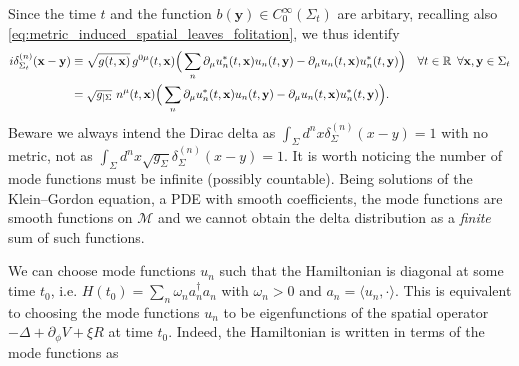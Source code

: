 \documentclass[../QFT_main.tex]{subfiles}
\begin{document}
\begin{mytheorem}
\noindent
Since the time $t$ and the function $b(\mathbf{y})\in C^\infty_0(\Sigma_t)$ are arbitary, recalling also \eqref{eq:metric_induced_spatial_leaves_folitation}, we thus identify
{\small
\begin{align}\label{eq:completeness_relation_bogoliubov_basis_explicit}
  i\delta^{(n)}_{\Sigma_t}(\mathbf{x}-\mathbf{y}) &\equiv \sqrt{g(t,\mathbf{x})}\, g^{0\mu}(t,\mathbf{x}) \Big( \sum_n \partial_\mu u_n^*(t,\mathbf{x}) u_n(t,\mathbf{y})-\partial_\mu u_n(t,\mathbf{x}) u_n^*(t,\mathbf{y}) \Big)\quad \forall t\in\mathbb{R}\,\,\, \forall \mathbf{x},\mathbf{y}\in \Sigma_t\\
  &=\sqrt{g_{|\Sigma}}\,\, n^\mu(t,\mathbf{x}) \Big( \sum_n \partial_\mu u_n^*(t,\mathbf{x}) u_n(t,\mathbf{y})-\partial_\mu u_n(t,\mathbf{x}) u_n^*(t,\mathbf{y}) \Big).
\end{align}}
Beware we always intend the Dirac delta as $\int_\Sigma\!\! d^nx \delta^{(n)}_\Sigma(x-y)=1$ with no metric, not as $\int_\Sigma \!\!d^nx\sqrt{g_\Sigma}\delta^{(n)}_\Sigma(x-y)=1$.
It is worth noticing the number of mode functions must be infinite (possibly countable).
Being solutions of the Klein--Gordon equation, a PDE with smooth coefficients, the mode functions are smooth functions on $\mathcal{M}$ and we cannot obtain the delta distribution as a \emph{finite} sum of such functions.
%
\end{mytheorem}

\begin{mytheorem}
{\color{red}We can choose mode functions $u_n$ such that the Hamiltonian is diagonal at some time $t_0$, i.e. $H(t_0) = \sum_n \omega_n a_n^\dagger a_n$ with $\omega_n>0$ and $a_n = \langle u_n, \cdot \rangle$.
This is equivalent to choosing the mode functions $u_n$ to be eigenfunctions of the spatial operator $-\Delta + \partial_\phi V + \xi R$ at time $t_0$.
Indeed, the Hamiltonian is written in terms of the mode functions as}
\end{mytheorem}
\end{document}
